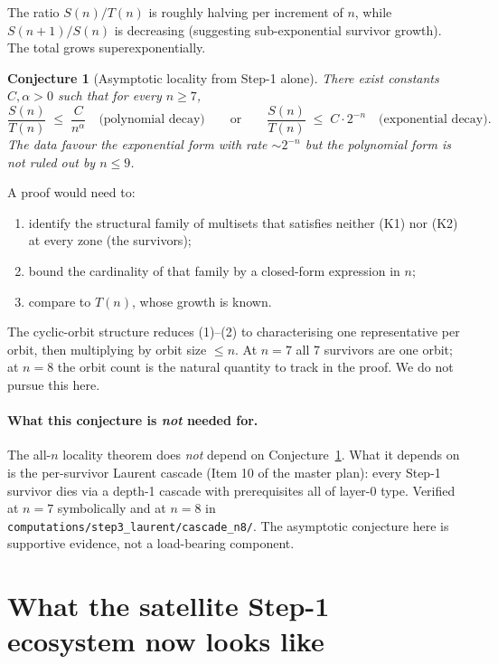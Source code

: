 \documentclass[11pt]{article}
\newtheorem{conj}[thm]{Conjecture}
\theoremstyle{definition}
\begin{document}
The ratio $S(n)/T(n)$ is roughly halving per increment of $n$, while
$S(n+1)/S(n)$ is decreasing (suggesting sub-exponential survivor
growth). The total grows superexponentially.

\begin{conj}[Asymptotic locality from Step-1 alone]\label{conj:asympt}
There exist constants $C, \alpha > 0$ such that for every $n \ge 7$,
\[
   \frac{S(n)}{T(n)} \;\le\; \frac{C}{n^{\alpha}}
   \quad\text{(polynomial decay)}\qquad\text{or}\qquad
   \frac{S(n)}{T(n)} \;\le\; C \cdot 2^{-n}
   \quad\text{(exponential decay).}
\]
The data favour the exponential form with rate $\sim 2^{-n}$ but the
polynomial form is not ruled out by $n \le 9$.
\end{conj}

A proof would need to:
\begin{enumerate}[leftmargin=*,topsep=0pt,itemsep=2pt]
\item identify the structural family of multisets that satisfies neither
       (K1) nor (K2) at every zone (the survivors);
\item bound the cardinality of that family by a closed-form expression
       in $n$;
\item compare to $T(n)$, whose growth is known.
\end{enumerate}
The cyclic-orbit structure reduces (1)--(2) to characterising one
representative per orbit, then multiplying by orbit size $\le n$.
At $n = 7$ all 7 survivors are one orbit; at $n = 8$ the orbit count is
the natural quantity to track in the proof. We do not pursue this here.

\paragraph{What this conjecture is \emph{not} needed for.} The all-$n$
locality theorem does \emph{not} depend on
Conjecture~\ref{conj:asympt}. What it depends on is the per-survivor
Laurent cascade (Item 10 of the master plan): every Step-1 survivor
dies via a depth-1 cascade with prerequisites all of layer-0 type.
Verified at $n = 7$ symbolically and at $n = 8$ in
\verb|computations/step3_laurent/cascade_n8/|. The asymptotic
conjecture here is supportive evidence, not a load-bearing component.

\section{What the satellite Step-1 ecosystem now looks like}
\end{document}
